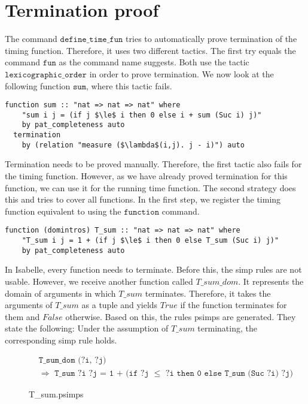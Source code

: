 

\section{Termination proof} \label{chapter:termination}

The command $\texttt{define\_time\_fun}$ tries to automatically prove termination of the timing function.
Therefore, it uses two different tactics.
The first try equals the command $\texttt{fun}$ as the command name suggests.
Both use the tactic $\texttt{lexicographic\_order}$ in order to prove termination.
We now look at the following function $\texttt{sum}$, where this tactic fails.
\begin{lstlisting}[language=isabelle,mathescape=true]
  function sum :: "nat => nat => nat" where
    "sum i j = (if j $\le$ i then 0 else i + sum (Suc i) j)"
    by pat_completeness auto
  termination
    by (relation "measure ($\lambda$(i,j). j - i)") auto
\end{lstlisting}

Termination needs to be proved manually.
Therefore, the first tactic also fails for the timing function.
However, as we have already proved termination for this function, we can use it for the running time function.
The second strategy does this and tries to cover all functions.
In the first step, we register the timing function equivalent to using the $\texttt{function}$ command.
\begin{lstlisting}[language=isabelle,mathescape=true,caption=Function registration,label=lst:sum_reg]
  function (domintros) T_sum :: "nat => nat => nat" where
    "T_sum i j = 1 + (if j $\le$ i then 0 else T_sum (Suc i) j)"
    by pat_completeness auto
\end{lstlisting}
In Isabelle, every function needs to terminate.
Before this, the simp rules are not usable.
However, we receive another function called $T\_sum\_dom$.
It represents the domain of arguments in which $T\_sum$ terminates.
Therefore, it takes the arguments of $T\_sum$ as a tuple and yields $True$ if the function terminates for them and $False$ otherwise.
Based on this, the rules psimps are generated.
They state the following: Under the assumption of $T\_sum$ terminating, the corresponding simp rule holds.

\begin{figure}[H]
\begin{align*}
  &\texttt{T\_sum\_dom (?i, ?j)}\\
  &\texttt{$\Longrightarrow$ T\_sum ?i ?j = 1 + (if ?j $\le$ ?i then 0 else T\_sum (Suc ?i) ?j)}
\end{align*}
\caption{T\_sum.psimps}
\end{figure}

